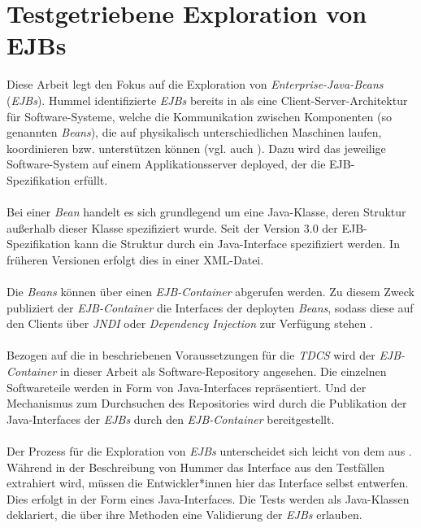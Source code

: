 \section{Testgetriebene Exploration von EJBs}\label{sec_tdcs_ejb}
Diese Arbeit legt den Fokus auf die Exploration von \emph{Enterprise-Java-Beans} (\emph{EJBs}). Hummel identifizierte \emph{EJBs} bereits in \cite{hummel08} als eine Client-Server-Architektur für Software-Systeme, welche die Kommunikation zwischen Komponenten (so genannten \emph{Beans}), die auf physikalisch unterschiedlichen Maschinen laufen, koordinieren bzw. unterstützen können (vgl. auch \cite{ejbspec}). Dazu wird das jeweilige Software-System auf einem Applikationsserver deployed, der die EJB-Spezifikation \cite{ejbspec} erfüllt.
\\\\
Bei einer \emph{Bean} handelt es sich grundlegend um eine Java-Klasse, deren Struktur außerhalb dieser Klasse spezifiziert wurde. Seit der Version 3.0 der EJB-Spezifikation kann die Struktur durch ein Java-Interface spezifiziert werden. In früheren Versionen erfolgt dies in einer XML-Datei. \cite{ejbspec}
\\\\
Die \emph{Beans} können über einen \emph{EJB-Container} abgerufen werden. Zu diesem Zweck publiziert der \emph{EJB-Container} die Interfaces der deployten \emph{Beans}, sodass diese auf den Clients über \emph{JNDI} oder \emph{Dependency Injection} zur Verfügung stehen \cite{ejbspec}.
\\\\
Bezogen auf die in \cite{hummel08} beschriebenen Voraussetzungen für die \emph{TDCS} wird der \emph{EJB-Container} in dieser Arbeit als Software-Repository angesehen. Die einzelnen Softwareteile werden in Form von Java-Interfaces repräsentiert. Und der Mechanismus zum Durchsuchen des Repositories wird durch die Publikation der Java-Interfaces der \emph{EJBs} durch den \emph{EJB-Container} bereitgestellt.
\\\\
Der Prozess für die Exploration von \emph{EJBs} unterscheidet sich leicht von dem aus . Während in der Beschreibung von Hummer das Interface aus den Testfällen extrahiert wird, müssen die Entwickler*innen hier das Interface selbst entwerfen. Dies erfolgt in der Form eines Java-Interfaces. Die Tests werden als Java-Klassen deklariert, die über ihre Methoden eine Validierung der \emph{EJBs} erlauben.
\\\\
